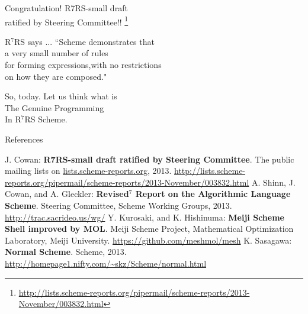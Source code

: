 \documentclass[dvipdfmx,12pt,fleqn]{beamer}
\begin{document}
\begin{frame}{Congratulation!}
\pause\Huge
R7RS-small draft\\
\alert{ratified} \Large{}by Steering Committee!!
\footnote{\url{http://lists.scheme-reports.org/pipermail/scheme-reports/2013-November/003832.html}}
\end{frame}

\begin{frame}{R$^7$RS says ...}
\Large
``Scheme demonstrates that\\
\pause \alert{a very small number of rules}\\
for forming expressions,\pause with no restrictions\\
\pause \alert{on how they are composed}."
\end{frame}

\begin{frame}{So, today.}
\huge
Let us think what is\\
\alert{The Genuine Programming}\\
In R$^7$RS Scheme.
\end{frame}

\begin{frame}{References}
\footnotesize
\begin{thebibliography}{9}
\beamertemplatetextbibitems
{} J. Cowan: \textbf{R7RS-small draft ratified by Steering Committee}. The public mailing lists on \url{lists.scheme-reports.org}, 2013. \url{http://lists.scheme-reports.org/pipermail/scheme-reports/2013-November/003832.html}
 A. Shinn, J. Cowan, and A. Gleckler: \textbf{Revised$^7$ Report on the Algorithmic Language Scheme}. Steering Committee, Scheme Working Groups, 2013. \url{http://trac.sacrideo.us/wg/}
 Y. Kurosaki, and K. Hishinuma: \textbf{Meiji Scheme Shell improved by MOL}. Meiji Scheme Project, Mathematical Optimization Laboratory, Meiji University. \url{https://github.com/meshmol/mesh}
 K. Sasagawa: \textbf{Normal Scheme}. Scheme, 2013. \url{http://homepage1.nifty.com/~skz/Scheme/normal.html}
\end{thebibliography}
\end{frame}
\end{document}
